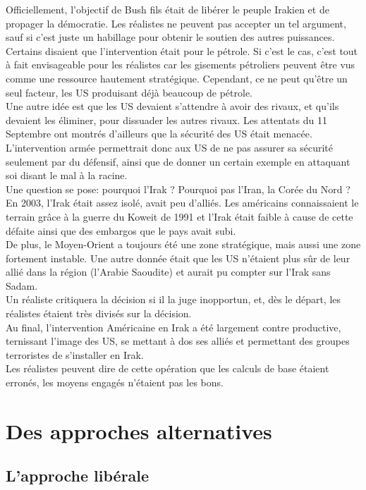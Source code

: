 \documentclass[10pt, a4paper, openany]{book}
\begin{document}
Officiellement, l'objectif de Bush fils était de libérer le peuple Irakien et de propager la démocratie. Les réalistes ne peuvent pas accepter un tel argument, sauf si c'est juste un habillage pour obtenir le soutien des autres puissances. \\
Certains disaient que l'intervention était pour le pétrole. Si c'est le cas, c'est tout à fait envisageable pour les réalistes car les gisements pétroliers peuvent être vus comme une ressource hautement stratégique. Cependant, ce ne peut qu'être un seul facteur, les US produisant déjà beaucoup de pétrole. \\
Une autre idée est que les US devaient s'attendre à avoir des rivaux, et qu'ils devaient les éliminer, pour dissuader les autres rivaux. Les attentats du 11 Septembre ont montrés d'ailleurs que la sécurité des US était menacée. L'intervention armée permettrait donc aux US de ne pas assurer sa sécurité seulement par du défensif, ainsi que de donner un certain exemple en attaquant soi disant le mal à la racine. \\
Une question se pose: pourquoi l'Irak ? Pourquoi pas l'Iran, la Corée du Nord ? En 2003, l'Irak était assez isolé, avait peu d'alliés. Les américains connaissaient le terrain grâce à la guerre du Koweit de 1991 et l'Irak était faible à cause de cette défaite ainsi que des embargos que le pays avait subi. \\
De plus, le Moyen-Orient a toujours été une zone stratégique, mais aussi une zone fortement instable. Une autre donnée était que les US n'étaient plus sûr de leur allié dans la région (l'Arabie Saoudite) et aurait pu compter sur l'Irak sans Sadam. \\
Un réaliste critiquera la décision si il la juge inopportun, et, dès le départ, les réalistes étaient très divisés sur la décision. \\
Au final, l'intervention Américaine en Irak a été largement contre productive, ternissant l'image des US, se mettant à dos ses alliés et permettant des groupes terroristes de s'installer en Irak. \\
Les réalistes peuvent dire de cette opération que les calculs de base étaient erronés, les moyens engagés n'étaient pas les bons. 

\section{Des approches alternatives}

\subsection{L'approche libérale}
\end{document}
